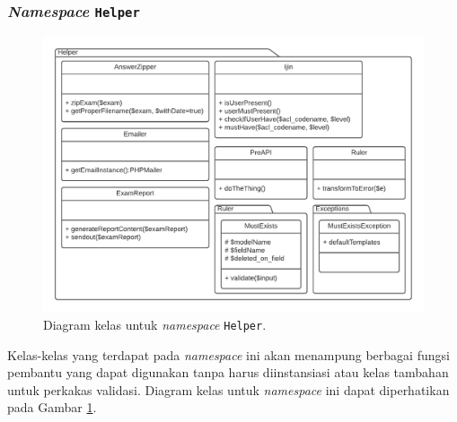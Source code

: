 \subsubsection{\textit{Namespace} \texttt{Helper}}
    \begin{figure}
        \centering
        \includegraphics[width=0.75\paperwidth]{Gambar/classmap-be/Classmap - app-helper.pdf}
        \caption{Diagram kelas untuk \textit{namespace} \texttt{Helper}.}
        \label{fig:classmap_app-helper}
    \end{figure}
    Kelas-kelas yang terdapat pada \textit{namespace} ini akan menampung
    berbagai fungsi pembantu yang dapat digunakan tanpa harus diinstansiasi atau
    kelas tambahan untuk perkakas validasi. Diagram kelas untuk
    \textit{namespace} ini dapat diperhatikan pada Gambar
    \ref{fig:classmap_app-helper}.
    
